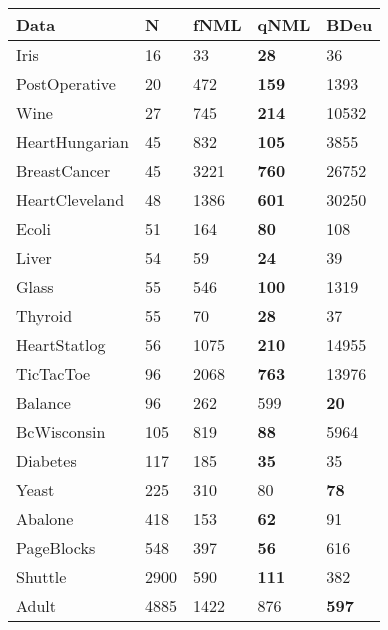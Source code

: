 \begin{tabular}{lllll}
\toprule
           Data &     N &  fNML &          qNML &          BDeu \\
\midrule
           Iris &    16 &    33 &   \textbf{28} &            36 \\
  PostOperative &    20 &   472 &  \textbf{159} &          1393 \\
           Wine &    27 &   745 &  \textbf{214} &         10532 \\
 HeartHungarian &    45 &   832 &  \textbf{105} &          3855 \\
   BreastCancer &    45 &  3221 &  \textbf{760} &         26752 \\
 HeartCleveland &    48 &  1386 &  \textbf{601} &         30250 \\
          Ecoli &    51 &   164 &   \textbf{80} &           108 \\
          Liver &    54 &    59 &   \textbf{24} &            39 \\
          Glass &    55 &   546 &  \textbf{100} &          1319 \\
        Thyroid &    55 &    70 &   \textbf{28} &            37 \\
   HeartStatlog &    56 &  1075 &  \textbf{210} &         14955 \\
      TicTacToe &    96 &  2068 &  \textbf{763} &         13976 \\
        Balance &    96 &   262 &           599 &   \textbf{20} \\
    BcWisconsin &   105 &   819 &   \textbf{88} &          5964 \\
       Diabetes &   117 &   185 &   \textbf{35} &            35 \\
          Yeast &   225 &   310 &            80 &   \textbf{78} \\
        Abalone &   418 &   153 &   \textbf{62} &            91 \\
     PageBlocks &   548 &   397 &   \textbf{56} &           616 \\
        Shuttle &  2900 &   590 &  \textbf{111} &           382 \\
          Adult &  4885 &  1422 &           876 &  \textbf{597} \\
\bottomrule
\end{tabular}
